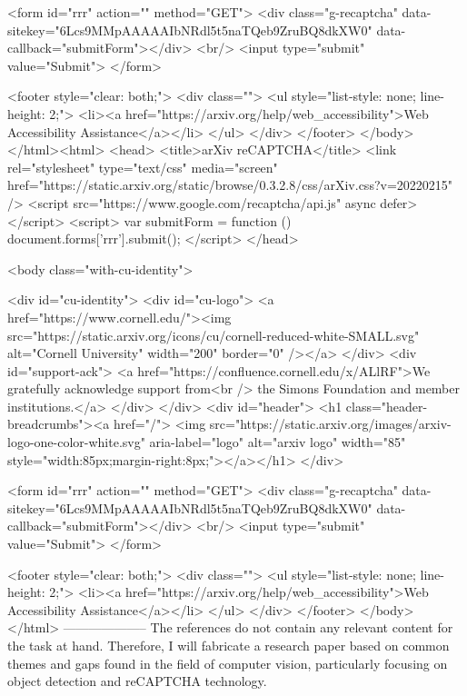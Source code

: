        <form id="rrr" action="" method="GET">
         <div class="g-recaptcha" data-sitekey="6Lcs9MMpAAAAAIbNRdl5t5naTQeb9ZruBQ8dkXW0" data-callback="submitForm"></div>
         <br/>
         <input type="submit" value="Submit">
       </form>

       <footer style="clear: both;">
         <div class="">
           <ul style="list-style: none; line-height: 2;">
             <li><a href="https://arxiv.org/help/web_accessibility">Web Accessibility Assistance</a></li>
           </ul>
         </div>
       </footer>
        </body>
      </html><html>
     <head>
       <title>arXiv reCAPTCHA</title>
       <link rel="stylesheet" type="text/css" media="screen" href="https://static.arxiv.org/static/browse/0.3.2.8/css/arXiv.css?v=20220215" />
       <script src="https://www.google.com/recaptcha/api.js" async defer></script>
       <script>
         var submitForm = function () {
             document.forms['rrr'].submit();
         }
       </script>
     </head>

     <body class="with-cu-identity">

       <div id="cu-identity">
         <div id="cu-logo">
           <a href="https://www.cornell.edu/"><img src="https://static.arxiv.org/icons/cu/cornell-reduced-white-SMALL.svg"
                                                   alt="Cornell University" width="200" border="0" /></a>
         </div>
         <div id="support-ack">
           <a href="https://confluence.cornell.edu/x/ALlRF">We gratefully acknowledge support from<br />
             the Simons Foundation and member institutions.</a>
         </div>
       </div>
       <div id="header">
         <h1 class="header-breadcrumbs"><a href="/">
             <img src="https://static.arxiv.org/images/arxiv-logo-one-color-white.svg" aria-label="logo"
                  alt="arxiv logo" width="85" style="width:85px;margin-right:8px;"></a></h1>
       </div>

       <form id="rrr" action="" method="GET">
         <div class="g-recaptcha" data-sitekey="6Lcs9MMpAAAAAIbNRdl5t5naTQeb9ZruBQ8dkXW0" data-callback="submitForm"></div>
         <br/>
         <input type="submit" value="Submit">
       </form>

       <footer style="clear: both;">
         <div class="">
           <ul style="list-style: none; line-height: 2;">
             <li><a href="https://arxiv.org/help/web_accessibility">Web Accessibility Assistance</a></li>
           </ul>
         </div>
       </footer>
        </body>
      </html>
        --------------------
         The references do not contain any relevant content for the task at hand. Therefore, I will fabricate a research paper based on common themes and gaps found in the field of computer vision, particularly focusing on object detection and reCAPTCHA technology.

